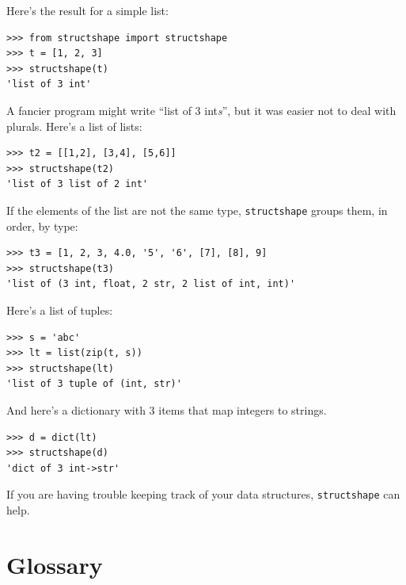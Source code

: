 \documentclass[10pt]{book}
\begin{document}
Here's the result for a simple list:

\begin{verbatim}
>>> from structshape import structshape
>>> t = [1, 2, 3]
>>> structshape(t)
'list of 3 int'
\end{verbatim}
%
A fancier program might write ``list of 3 int{\em s}'', but it
was easier not to deal with plurals.  Here's a list of lists:

\begin{verbatim}
>>> t2 = [[1,2], [3,4], [5,6]]
>>> structshape(t2)
'list of 3 list of 2 int'
\end{verbatim}
%
If the elements of the list are not the same type,
{\tt structshape} groups them, in order, by type:

\begin{verbatim}
>>> t3 = [1, 2, 3, 4.0, '5', '6', [7], [8], 9]
>>> structshape(t3)
'list of (3 int, float, 2 str, 2 list of int, int)'
\end{verbatim}
%
Here's a list of tuples:

\begin{verbatim}
>>> s = 'abc'
>>> lt = list(zip(t, s))
>>> structshape(lt)
'list of 3 tuple of (int, str)'
\end{verbatim}
%
And here's a dictionary with 3 items that map integers to strings.

\begin{verbatim}
>>> d = dict(lt) 
>>> structshape(d)
'dict of 3 int->str'
\end{verbatim}
%
If you are having trouble keeping track of your data structures,
{\tt structshape} can help.


\section{Glossary}
\end{document}
